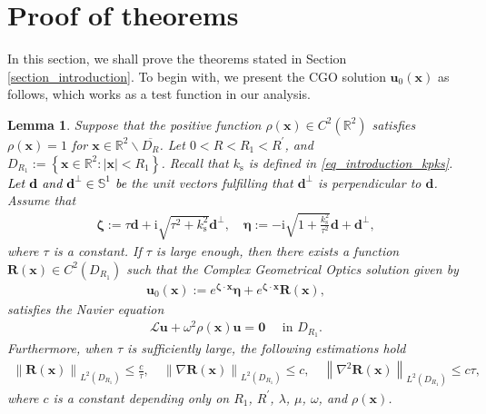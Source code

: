 \documentclass[11pt,reqno,oneside]{amsart}
\newtheorem{lemma}{Lemma}[section]
\theoremstyle{definition}
\theoremstyle{remark}
\numberwithin{equation}{section}
\numberwithin{equation}{section}
\theoremstyle{remark}
\begin{document}
\section{Proof of theorems} \label{section_inverse_problem}

In this section, we shall prove the theorems stated in Section \ref{section_introduction}. To begin with, we present the CGO solution $ \mathbf{u}_0 \left(\mathbf{x}\right) $ as follows, which works as a test function in our analysis. 

\begin{lemma} \label{lem_CGOs}
	Suppose that the positive function $ \rho\left(\mathbf{x}\right)\in C^2\left(\mathbb{R}^2\right) $ satisfies $ \rho\left(\mathbf{x}\right)=1 $ for $ \mathbf{x}\in\mathbb{R}^2 \backslash \overline{D_R} $. Let $ 0 < R < R_1 < R^{\prime} $, and $ D_{R_1}:=\left\{\mathbf{x} \in \mathbb{R}^2:\left| \mathbf{x} \right|< R_1\right\} $. Recall that $ k_{\mathrm{s}} $ is defined in \eqref{eq_introduction_kpks}. \textcolor{black}{Let $ \mathbf{d} $ and $ \mathbf{d}^{\perp}\in \mathbb{S}^1 $ be} the unit vectors fulfilling that $ \mathbf{d}^{\perp} $ is perpendicular to $ \mathbf{d} $. Assume that 
	\begin{align} \label{def_IP_zeta_eta}
		\bm{\zeta} := \tau \mathbf{d} + \mathrm{i}\sqrt{ \tau^2 + k_{\mathrm{s}}^2 } \mathbf{d}^{\perp}, \quad \bm{\eta} := - \mathrm{i} \sqrt{ 1 + \frac{k_{\mathrm{s}}^2}{\tau^2}} \mathbf{d} + \mathbf{d}^\perp,
	\end{align}
	where $ \tau $ is a constant. If $\tau$ is large enough, then there exists a function  $ \mathbf{R}\left(\mathbf{x}\right)\in C^2\left(D_{R_1}\right) $ such that the Complex Geometrical Optics solution given by
	\begin{align} \label{def_CGOs_u0}
		\mathbf{u}_0 \left(\mathbf{x}\right) := e^{\bm{\zeta} \cdot \mathbf{x}} \bm{\eta} + e^{\bm{\zeta} \cdot \mathbf{x}} \mathbf{R}\left(\mathbf{x}\right), 
	\end{align}
	satisfies the Navier equation 
	\begin{align} \label{eq_CGOs_Navier_equation_no_source}
		\mathcal{L} \mathbf{u} + \omega^2 \rho\left(\mathbf{x}\right) \mathbf{u} = \bm{0} \quad \text{ in } D_{R_1}.
	\end{align}
	Furthermore, when $ \tau $ is sufficiently large, the following estimations hold
	\begin{align} \label{est_inverse_problem_CGO}
		\left\| \mathbf{R} \left(\mathbf{x}\right) \right\|_{L^2 \left(D_{R_1}\right)} \leqslant \frac{c}{\tau}, \quad \left\| \nabla \mathbf{R} \left(\mathbf{x}\right) \right\|_{L^2 \left(D_{R_1}\right)} \leqslant c, \quad \left\| \nabla^2 \mathbf{R} \left(\mathbf{x}\right) \right\|_{L^2 \left(D_{R_1}\right)} \leqslant c \tau, 
	\end{align}
	where $ c $ is a constant depending only on $ R_1 $, $ R^{\prime} $, $ \lambda $, $ \mu $, $ \omega $, and $ \rho\left(\mathbf{x}\right) $.
\end{lemma}
\end{document}
